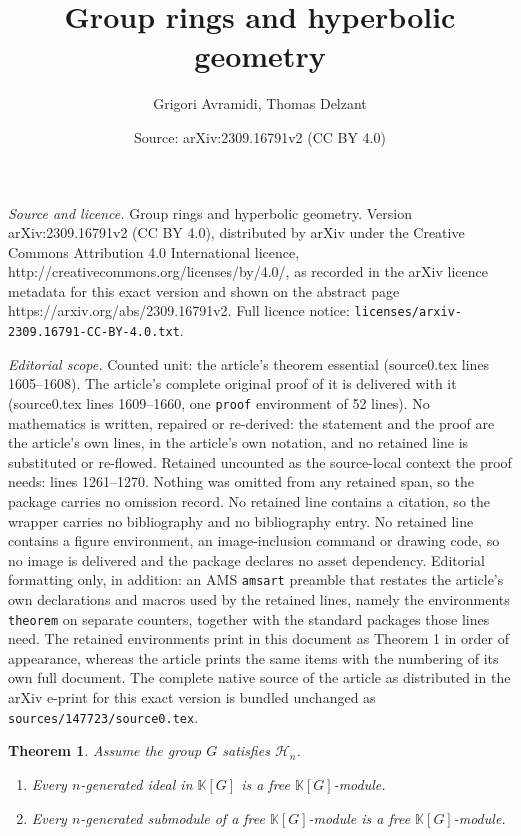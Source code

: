 \documentclass[10pt,a4paper]{amsart}
\title{Group rings and hyperbolic geometry}
\author{Grigori Avramidi, Thomas Delzant}
\date{Source: arXiv:2309.16791v2 (CC BY 4.0)}
\newtheorem{theorem}{Theorem}
\begin{document}
\maketitle

\noindent\emph{Source and licence.} Group rings and hyperbolic geometry. Version arXiv:2309.16791v2 (CC BY 4.0), distributed by arXiv under the Creative Commons Attribution 4.0 International licence, http://creativecommons.org/licenses/by/4.0/, as recorded in the arXiv licence metadata for this exact version and shown on the abstract page https://arxiv.org/abs/2309.16791v2. Full licence notice: \texttt{licenses/arxiv-2309.16791-CC-BY-4.0.txt}.\par\smallskip

\noindent\textit{Editorial scope.} Counted unit: the article's theorem essential (source0.tex lines 1605--1608). The article's complete original proof of it is delivered with it (source0.tex lines 1609--1660, one \texttt{proof} environment of 52 lines). No mathematics is written, repaired or re-derived: the statement and the proof are the article's own lines, in the article's own notation, and no retained line is substituted or re-flowed.  Retained uncounted as the source-local context the proof needs: lines 1261--1270.  Nothing was omitted from any retained span, so the package carries no omission record.  No retained line contains a citation, so the wrapper carries no bibliography and no bibliography entry.  No retained line contains a figure environment, an image-inclusion command or drawing code, so no image is delivered and the package declares no asset dependency.  Editorial formatting only, in addition: an AMS \texttt{amsart} preamble that restates the article's own declarations and macros used by the retained lines, namely the environments \texttt{theorem} on separate counters, together with the standard packages those lines need.  The retained environments print in this document as Theorem 1 in order of appearance, whereas the article prints the same items with the numbering of its own full document.  The complete native source of the article as distributed in the arXiv e-print for this exact version is bundled unchanged as \texttt{sources/147723/source0.tex}.
\begin{theorem}
\label{freemodules}
Assume the group $G$ satisfies ${\mathcal{H}_{n}}$.
\begin{enumerate}
\item[1.] 
Every $n$-generated ideal in $\mathbb{K} [G]$ is a free $\mathbb{K}[G]$-module.
\item[2.] 
Every $n$-generated submodule of a free $\mathbb{K} [G]$-module is a free $\mathbb{K} [G]$-module.
\end{enumerate}
\end{theorem}
\end{document}
